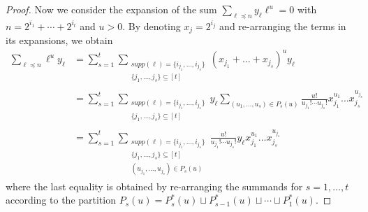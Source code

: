 \documentclass[11pt]{llncs}
\begin{document}
\begin{proof}
Now we consider the expansion of the sum $\sum_{\ell \preceq n } y_{\ell} \ell^u = 0$ with $n=2^{i_1}+\cdots + 2^{i_t}$ and $u>0$. By denoting $x_j=2^{i_j}$ and re-arranging the terms in its expansions, we obtain
\begin{equation}\label{key}
\begin{aligned}
\sum_{\ell \preceq n } \ell^u y_{\ell}  & = \sum_{s=1}^t \sum_{\substack{supp(\ell) = \{i_{j_1},\dots, i_{j_s}\} \\ \{j_1,\dots, j_s\} \subseteq [t] \\ }}  (x_{j_1}+\dots + x_{j_s})^u y_\ell
\\&= \sum_{s=1}^t \sum_{\substack{supp(\ell) = \{i_{j_1},\dots, i_{j_s}\} \\ \{j_1,\dots, j_s\} \subseteq [t] \\ }}  y_\ell \sum\limits_{(u_1,\dots, u_s) \in P_s(u)} \frac{u!}{u_{j_1}!\cdots u_{j_s}!} x_{j_1}^{u_1}\dots x_{j_s}^{u_{j_s}}
\\& =  \sum_{s=1}^t\sum\limits_{\substack{supp(\ell) = \{i_{j_1},\dots, i_{j_s}\}  \\ \{j_1,\dots, j_s\} \subseteq [t] \\ (u_{j_1},\dots, u_{j_s})\in P_s(u)}} \frac{u!}{u_{j_1}!\cdots u_{j_s}!} y_\ell   x_{j_1}^{u_1}\dots x_{j_s}^{u_{j_s}}
\end{aligned}
\end{equation} where the last equality is obtained by re-arranging the summands for $s=1,\dots, t$ according to the partition $P_{s}(u) = P^*_{s}(u) \sqcup P^*_{s-1}(u) \sqcup \cdots \sqcup P^*_1(u)$.
\end{proof}
\end{document}

